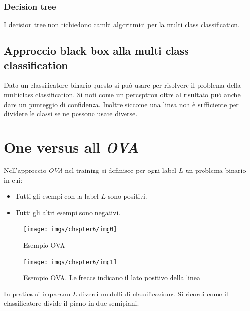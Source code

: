 		\subsubsection{Decision tree}
		I decision tree non richiedono cambi algoritmici per la multi class classification.
	
	\subsection{Approccio black box alla multi class classification}
	Dato un classificatore binario questo si pu\`o usare per risolvere il problema della multiclass classification.
	Si noti come un perceptron oltre al risultato pu\`o anche dare un punteggio di confidenza.
	Inoltre siccome una linea non \`e sufficiente per dividere le classi se ne possono usare diverse.

\section{One versus all \emph{OVA}}
Nell'approccio \emph{OVA} nel training si definisce per ogni label $L$ un problema binario in cui:
\begin{itemize}
	\item Tutti gli esempi con la label $L$ sono positivi.
	\item Tutti gli altri esempi sono negativi.
\end{itemize}


\begin{figure}
	\centering
	\begin{minipage}{.5\textwidth}
		\centering
		\texttt{[image: imgs/chapter6/img0]}
		\caption{Esempio OVA}
		\label{fig:chapter06-00}
	\end{minipage}%
	\begin{minipage}{.5\textwidth}
		\centering
		\texttt{[image: imgs/chapter6/img1]}
		\caption{Esempio OVA. Le frecce indicano il lato positivo della linea}
		\label{fig:chapter06-01}
	\end{minipage}
\end{figure}

In pratica si imparano $L$ diversi modelli di classificazione.
Si ricordi come il classificatore divide il piano in due semipiani.

